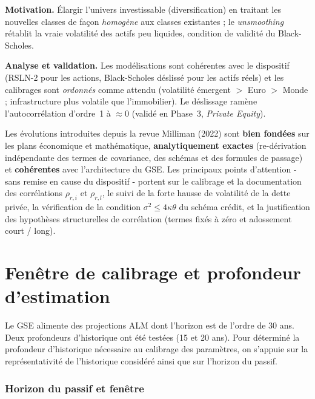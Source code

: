 \documentclass[11pt,a4paper]{article}
\begin{document}
\textbf{Motivation.} Élargir l'univers investissable (diversification) en traitant les nouvelles classes de façon \emph{homogène} aux classes existantes ; le \emph{unsmoothing} rétablit la vraie volatilité des actifs peu liquides, condition de validité du Black-Scholes.

\textbf{Analyse et validation.} Les modélisations sont cohérentes avec le dispositif (RSLN-2 pour les actions, Black-Scholes déslissé pour les actifs réels) et les calibrages sont \emph{ordonnés} comme attendu (volatilité émergent $>$ Euro $>$ Monde ; infrastructure plus volatile que l'immobilier). Le déslissage ramène l'autocorrélation d'ordre~1 à $\approx0$ (validé en Phase~3, \emph{Private Equity}).

\begin{insightbox}
Les évolutions introduites depuis la revue Milliman (2022) sont \textbf{bien fondées} sur les plans économique et mathématique, \textbf{analytiquement exactes} (re-dérivation indépendante des termes de covariance, des schémas et des formules de passage) et \textbf{cohérentes} avec l'architecture du GSE. Les principaux points d'attention - sans remise en cause du dispositif - portent sur le calibrage et la documentation des corrélations $\rho_{r,i}$ et $\rho_{r,l}$, le suivi de la forte hausse de volatilité de la dette privée, la vérification de la condition $\sigma^2\le 4\kappa\theta$ du schéma crédit, et la justification des hypothèses structurelles de corrélation (termes fixés à zéro et adossement court / long).
\end{insightbox}

\clearpage
\section{Fenêtre de calibrage et profondeur d'estimation}
\label{sec:fenetre}

Le GSE alimente des projections ALM dont l'horizon est de l'ordre de 30 ans. Deux profondeurs d'historique ont été testées (15 et 20 ans). Pour déterminé la profondeur d’historique nécessaire au calibrage des paramètres, on s’appuie sur la représentativité de l'historique considéré ainsi que sur l’horizon du passif.

\subsubsection*{Horizon du passif et fenêtre}
\end{document}

